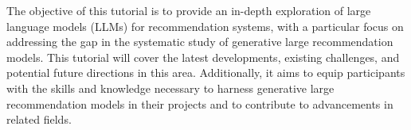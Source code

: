 The objective of this tutorial is to provide an in-depth exploration of large language models (LLMs) for recommendation systems, with a particular focus on addressing the gap in the systematic study of generative large recommendation models. This tutorial will cover the latest developments, existing challenges, and potential future directions in this area. Additionally, it aims to equip participants with the skills and knowledge necessary to harness generative large recommendation models in their projects and to contribute to advancements in related fields.